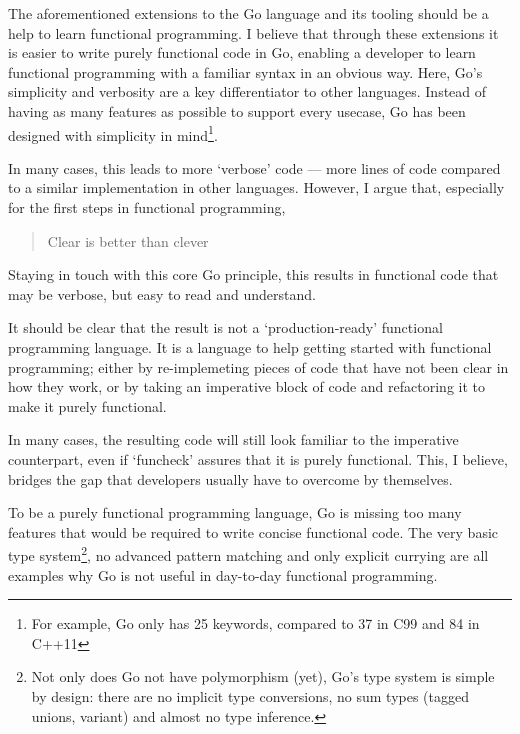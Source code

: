 
The aforementioned extensions to the Go language and its tooling should be a help to learn
functional programming. I believe that through these extensions it is easier to write
purely functional code in Go, enabling a developer to learn functional programming with
a familiar syntax in an obvious way. Here, Go's simplicity and verbosity are a key differentiator
to other languages. Instead of having as many features as possible to support every usecase,
Go has been designed with simplicity in mind\footnote{For example, Go only has 25 keywords, compared
to 37 in C99 and 84 in C++11}.

In many cases, this leads to more `verbose' code --- more lines of code compared to a similar
implementation in other languages. However, I argue that, especially for the first steps
in functional programming,

\begin{quote}
Clear is better than clever\autocite{cheney-clear}
\end{quote}

Staying in touch with this core Go principle, this results in functional code that may be
verbose, but easy to read and understand.

It should be clear that the result is not a `production-ready' functional programming language.
It is a language to help getting started with functional programming; either by re-implemeting pieces
of code that have not been clear in how they work, or by taking an imperative block of code
and refactoring it to make it purely functional.

In many cases, the resulting code will still look familiar to the imperative counterpart,
even if `funcheck' assures that it is purely functional. This, I believe, bridges the gap
that developers usually have to overcome by themselves.

To be a purely functional programming language, Go is missing too many features that would be
required to write concise functional code. The very basic type system\footnote{Not only
	does Go not have polymorphism (yet), Go's type system is simple by design: there are no
	implicit type conversions, no sum types (tagged unions, variant) and almost no type inference.
}, no advanced pattern matching and only explicit currying are all examples why Go is not useful
in day-to-day functional programming.

